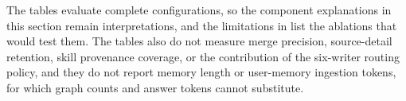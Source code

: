 The tables evaluate complete configurations, so the component explanations in
this section remain interpretations, and the limitations in
 list the ablations that would test them. The tables also
do not measure merge precision, source-detail retention, skill provenance
coverage, or the contribution of the six-writer routing policy, and they do not
report memory length or user-memory ingestion tokens, for which graph counts
and answer tokens cannot substitute.
